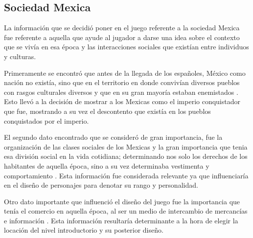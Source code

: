 	\subsection{Sociedad Mexica}
	La información que se decidió poner en el juego referente a la sociedad Mexica 
	fue referente a aquella que ayude al jugador a darse una idea sobre el contexto 
	que se vivía en esa época y las interacciones sociales que existían entre 
	individuos y culturas. 
	\\
	\par		
	Primeramente se encontró que antes de la llegada de los españoles, México como 
	nación no existía, sino que en el territorio en donde convivían diversos pueblos 
	con rasgos culturales diversos y que en su gran mayoría estaban enemistados
	\cite{RefMexicasMito}. Esto llevó a la decisión de mostrar a los Mexicas como el 
	imperio conquistador que fue, mostrando a su vez el descontento que existía en los 
	pueblos conquistados por el imperio.
	\\
	\par
	 El segundo dato encontrado que se consideró de gran importancia, fue la 
	 organización de las clases sociales de los Mexicas y la gran importancia que 
	 tenia esa división social en la vida cotidiana; determinando nos solo los 
	 derechos de los habitantes de aquella época, sino a su vez determinaba vestimenta 
	 y comportamiento \cite{RefCivilAztea}. Esta información fue considerada relevante 
	 ya que influenciaría en el diseño de personajes para denotar su rango y 
	 personalidad.
	 \\
	 \par
	 Otro dato importante que influenció el diseño del juego fue la importancia que 
	 tenía el comercio en aquella época, al ser un medio de intercambio de mercancías
	 e información \cite{RefMexicasMito}. Esta información resultaría determinante a la 
	 hora de elegir la locación del nivel introductorio y su posterior diseño.
	 
